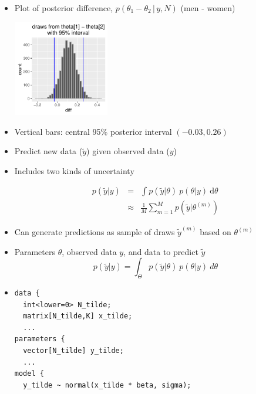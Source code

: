 \documentclass[10pt]{report}
\begin{document}
%
\begin{itemize}
\item Plot of posterior difference, $p(\theta_1 - \theta_2 \, | \, y,
  N)$ (men - women)
\begin{center}
\includegraphics[height=1.65in]{img/lefty-posterior.pdf}
\end{center}
\item Vertical bars: central 95\% posterior interval $(-0.03,0.26)$
\end{itemize}




%
\begin{itemize}
\item Predict new data ($\tilde{y}$) given observed data ($y$)
\item Includes two kinds of uncertainty
\vspace*{-8pt}\begin{eqnarray*}
p(\tilde{y} |  y)
& = & \int p(\tilde{y} | \theta)
           \ p(\theta | y)
           \ \mathrm{d}\theta
\\[4pt]
& \approx & \frac{1}{M} \sum_{m=1}^M p(\tilde{y} | \theta^{(m)})
\end{eqnarray*}
\item Can generate predictions as sample of draws $\tilde{y}^{(m)}$
  based on $\theta^{(m)}$
\end{itemize}


%
\begin{itemize}
\item Parameters $\theta$, observed data $y$, and data to predict $\tilde{y}$
\[
p(\tilde{y}|y) = \int_{\Theta} p(\tilde{y}|\theta) \ p(\theta|y) \ d\theta
\]
\item
{\small
\begin{Verbatim}
data {
  int<lower=0> N_tilde;
  matrix[N_tilde,K] x_tilde;
  ...
parameters {
  vector[N_tilde] y_tilde;
  ...
model {
  y_tilde ~ normal(x_tilde * beta, sigma);
\end{Verbatim}
}
\end{itemize}
\end{document}
